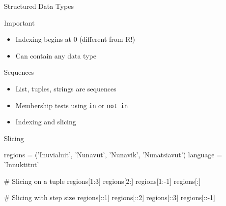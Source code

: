 \documentclass[ignorenonframetext,xcolor=x11names]{beamer}
\begin{document}
\begin{frame}{Structured Data Types}
\begin{block}{Important}
\begin{itemize}
  \item Indexing begins at 0 (different from R!)
  \item Can contain any data type
\end{itemize}
\end{block}

\begin{block}{Sequences}
\begin{itemize}
  \item List, tuples, strings are sequences
  \item Membership tests using \texttt{in} or \texttt{not in}
  \item Indexing and slicing
\end{itemize}
\end{block}
\end{frame}

\begin{frame}[fragile]{Slicing}
\footnotesize
\begin{pythoncode}
regions = ('Inuvialuit', 'Nunavut', 
           'Nunavik', 'Nunatsiavut')
language = 'Innuktitut'

# Slicing on a tuple
regions[1:3]
regions[2:]
regions[1:-1]
regions[:]

# Slicing with step size
regions[::1]
regions[::2]
regions[::3]
regions[::-1]
\end{pythoncode}
\end{frame}
\end{document}
